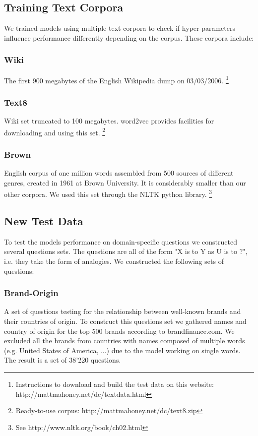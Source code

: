 \documentclass[conference]{IEEEtran}
\begin{document}
\subsection{Training Text Corpora}

We trained models using multiple text corpora to check if hyper-parameters influence performance differently depending on the corpus.
These corpora include:
\subsubsection{Wiki}
The first 900 megabytes of the English Wikipedia dump on 03/03/2006.
\footnote{Instructions to download and build the test data on this website: http://mattmahoney.net/dc/textdata.html}

\subsubsection{Text8}
Wiki set truncated to 100 megabytes. word2vec provides facilities for downloading and using this set.
\footnote{Ready-to-use corpus: http://mattmahoney.net/dc/text8.zip}

\subsubsection{Brown}
English corpus of one million words assembled from 500 sources of different genres, created in 1961 at Brown University.
It is considerably smaller than our other corpora.
We used this set through the NLTK python library.
\footnote{See http://www.nltk.org/book/ch02.html}

\subsection{New Test Data}
To test the models performance on domain-specific questions we constructed several 
questions sets. The questions are all of the form "X is to Y as U is to ?", i.e. they take the 
form of analogies. We constructed the following sets of questions:

\subsubsection{Brand-Origin}
A set of questions testing for the relationship between well-known brands and their countries
of origin. To construct this questions set we gathered names and country of origin for 
the top 500 brands according to brandfinance.com. We excluded all the brands from countries
with names composed of multiple words (e.g. United States of America, ...) due to the model 
working on single words. The result is a set of 38'220 questions.
\end{document}

